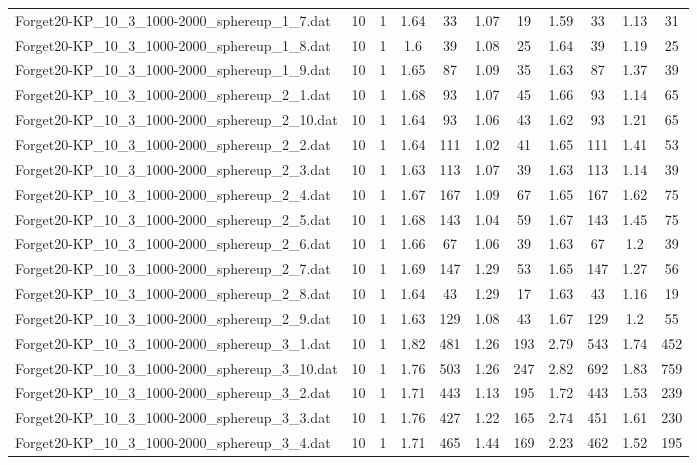 \begin{table}[!ht]
\begin{tabular}{lcccccccccc}
Forget20-KP\_10\_3\_1000-2000\_sphereup\_1\_7.dat & 10 & 1 & 1.64 & 33 & 1.07 & 19 & 1.59 & 33 & 1.13 & 31 \\
Forget20-KP\_10\_3\_1000-2000\_sphereup\_1\_8.dat & 10 & 1 & 1.6 & 39 & 1.08 & 25 & 1.64 & 39 & 1.19 & 25 \\
Forget20-KP\_10\_3\_1000-2000\_sphereup\_1\_9.dat & 10 & 1 & 1.65 & 87 & 1.09 & 35 & 1.63 & 87 & 1.37 & 39 \\
Forget20-KP\_10\_3\_1000-2000\_sphereup\_2\_1.dat & 10 & 1 & 1.68 & 93 & 1.07 & 45 & 1.66 & 93 & 1.14 & 65 \\
Forget20-KP\_10\_3\_1000-2000\_sphereup\_2\_10.dat & 10 & 1 & 1.64 & 93 & 1.06 & 43 & 1.62 & 93 & 1.21 & 65 \\
Forget20-KP\_10\_3\_1000-2000\_sphereup\_2\_2.dat & 10 & 1 & 1.64 & 111 & 1.02 & 41 & 1.65 & 111 & 1.41 & 53 \\
Forget20-KP\_10\_3\_1000-2000\_sphereup\_2\_3.dat & 10 & 1 & 1.63 & 113 & 1.07 & 39 & 1.63 & 113 & 1.14 & 39 \\
Forget20-KP\_10\_3\_1000-2000\_sphereup\_2\_4.dat & 10 & 1 & 1.67 & 167 & 1.09 & 67 & 1.65 & 167 & 1.62 & 75 \\
Forget20-KP\_10\_3\_1000-2000\_sphereup\_2\_5.dat & 10 & 1 & 1.68 & 143 & 1.04 & 59 & 1.67 & 143 & 1.45 & 75 \\
Forget20-KP\_10\_3\_1000-2000\_sphereup\_2\_6.dat & 10 & 1 & 1.66 & 67 & 1.06 & 39 & 1.63 & 67 & 1.2 & 39 \\
Forget20-KP\_10\_3\_1000-2000\_sphereup\_2\_7.dat & 10 & 1 & 1.69 & 147 & 1.29 & 53 & 1.65 & 147 & 1.27 & 56 \\
Forget20-KP\_10\_3\_1000-2000\_sphereup\_2\_8.dat & 10 & 1 & 1.64 & 43 & 1.29 & 17 & 1.63 & 43 & 1.16 & 19 \\
Forget20-KP\_10\_3\_1000-2000\_sphereup\_2\_9.dat & 10 & 1 & 1.63 & 129 & 1.08 & 43 & 1.67 & 129 & 1.2 & 55 \\
Forget20-KP\_10\_3\_1000-2000\_sphereup\_3\_1.dat & 10 & 1 & 1.82 & 481 & 1.26 & 193 & 2.79 & 543 & 1.74 & 452 \\
Forget20-KP\_10\_3\_1000-2000\_sphereup\_3\_10.dat & 10 & 1 & 1.76 & 503 & 1.26 & 247 & 2.82 & 692 & 1.83 & 759 \\
Forget20-KP\_10\_3\_1000-2000\_sphereup\_3\_2.dat & 10 & 1 & 1.71 & 443 & 1.13 & 195 & 1.72 & 443 & 1.53 & 239 \\
Forget20-KP\_10\_3\_1000-2000\_sphereup\_3\_3.dat & 10 & 1 & 1.76 & 427 & 1.22 & 165 & 2.74 & 451 & 1.61 & 230 \\
Forget20-KP\_10\_3\_1000-2000\_sphereup\_3\_4.dat & 10 & 1 & 1.71 & 465 & 1.44 & 169 & 2.23 & 462 & 1.52 & 195 \\

\end{tabular}
\end{table}
